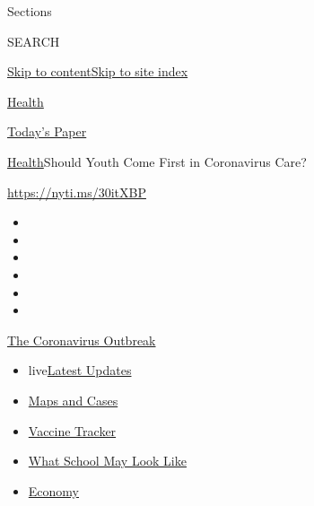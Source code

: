 Sections

SEARCH

\protect\hyperlink{site-content}{Skip to
content}\protect\hyperlink{site-index}{Skip to site index}

\href{https://www.nytimes.com/section/health}{Health}

\href{https://myaccount.nytimes.com/auth/login?response_type=cookie\&client_id=vi}{}

\href{https://www.nytimes.com/section/todayspaper}{Today's Paper}

\href{/section/health}{Health}\textbar{}Should Youth Come First in
Coronavirus Care?

\url{https://nyti.ms/30itXBP}

\begin{itemize}
\item
\item
\item
\item
\item
\item
\end{itemize}

\href{https://www.nytimes.com/news-event/coronavirus?action=click\&pgtype=Article\&state=default\&region=TOP_BANNER\&context=storylines_menu}{The
Coronavirus Outbreak}

\begin{itemize}
\tightlist
\item
  live\href{https://www.nytimes.com/2020/08/01/world/coronavirus-covid-19.html?action=click\&pgtype=Article\&state=default\&region=TOP_BANNER\&context=storylines_menu}{Latest
  Updates}
\item
  \href{https://www.nytimes.com/interactive/2020/us/coronavirus-us-cases.html?action=click\&pgtype=Article\&state=default\&region=TOP_BANNER\&context=storylines_menu}{Maps
  and Cases}
\item
  \href{https://www.nytimes.com/interactive/2020/science/coronavirus-vaccine-tracker.html?action=click\&pgtype=Article\&state=default\&region=TOP_BANNER\&context=storylines_menu}{Vaccine
  Tracker}
\item
  \href{https://www.nytimes.com/interactive/2020/07/29/us/schools-reopening-coronavirus.html?action=click\&pgtype=Article\&state=default\&region=TOP_BANNER\&context=storylines_menu}{What
  School May Look Like}
\item
  \href{https://www.nytimes.com/live/2020/07/31/business/stock-market-today-coronavirus?action=click\&pgtype=Article\&state=default\&region=TOP_BANNER\&context=storylines_menu}{Economy}
\end{itemize}


